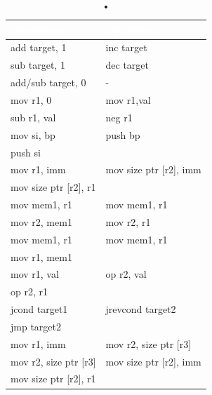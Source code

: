 \documentclass[12pt]{article}
\begin{document}
\begin{table}
\centering
\begin{tabular}{|l|l|}
\hline
   \rowcolor{ablack}
    \textcolor{white}{Generated} & \textcolor{white}{Optimized} \\ \hline
    
    \rowcolor{gray}
    add target, 1 & inc target \\ 
    
    sub target, 1 & dec target \\ 

	\rowcolor{gray}   
    add/sub target, 0 & - \\ 
    
    mov r1, 0 & mov r1,val\\ 
    sub r1, val & neg r1 \\  
       
    \rowcolor{gray}  
    mov si, bp & push bp \\ 
    \rowcolor{gray}    
    push si & \\
    
    mov r1, imm  & mov  size ptr [r2], imm \\ 
    mov size ptr [r2], r1 & \\  
    
    \rowcolor{gray}
    mov mem1, r1 & mov mem1, r1 \\ 
    \rowcolor{gray}
    mov r2, mem1 & mov r2, r1 \\ 
    
    mov mem1, r1 & mov mem1, r1 \\ 
    mov r1, mem1 & \\ 

    \rowcolor{gray}
    mov r1, val & op r2, val \\
    \rowcolor{gray} 
    op r2, r1  & \\ 

    jcond target1  & jrevcond target2 \\ 
    jmp target2 & \\ 

    \rowcolor{gray}
    mov r1, imm & mov r2, size ptr [r3] \\
    \rowcolor{gray}
    mov r2, size ptr [r3] & mov  size ptr [r2], imm \\
    \rowcolor{gray}
    mov size ptr [r2], r1 & \\
    
\hline
\end{tabular}
\caption{•}
\end{table}
\end{document}
